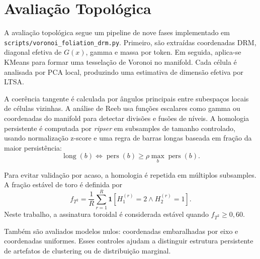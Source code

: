 \section{Avaliação Topológica}
\label{sec:avaliacao}

A avaliação topológica segue um pipeline de nove fases implementado em
\texttt{scripts/voronoi\_foliation\_drm.py}. Primeiro, são extraídas
coordenadas DRM, diagonal efetiva de $G(x)$, gamma e massa por token. Em
seguida, aplica-se KMeans para formar uma tesselação de Voronoi no manifold.
Cada célula é analisada por PCA local, produzindo uma estimativa de dimensão
efetiva por LTSA.

A coerência tangente é calculada por ângulos principais entre subespaços
locais de células vizinhas. A análise de Reeb usa funções escalares como gamma
ou coordenadas do manifold para detectar divisões e fusões de níveis. A
homologia persistente é computada por \emph{ripser} em subsamples de tamanho
controlado, usando normalização z-score e uma regra de barras longas baseada em
fração da maior persistência:
\begin{equation}
  \operatorname{long}(b) \iff
  \operatorname{pers}(b) \geq \rho \max_b \operatorname{pers}(b).
\end{equation}

Para evitar validação por acaso, a homologia é repetida em múltiplos
subsamples. A fração estável de toro é definida por
\begin{equation}
  f_{T^2} =
  \frac{1}{R}\sum_{r=1}^{R}
  \mathbf{1}[H_1^{(r)}=2 \land H_2^{(r)}=1].
\end{equation}
Neste trabalho, a assinatura toroidal é considerada estável quando
$f_{T^2}\geq 0{,}60$.

Também são avaliados modelos nulos: coordenadas embaralhadas por eixo e
coordenadas uniformes. Esses controles ajudam a distinguir estrutura
persistente de artefatos de clustering ou de distribuição marginal.
